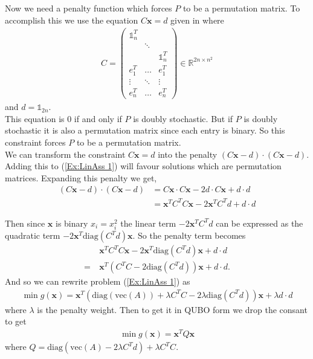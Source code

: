 \documentclass{article}
\begin{document}
\noindent Now we need a penalty function which forces \(P\) to be a permutation matrix. To accomplish this we use the equation \(C\mathbf{x} = d\) given in \cite[p.~8]{klus2023continuous} where 
\begin{align}\label{mat:CD}
    C = \begin{pmatrix}
        \mathbb{1}_n^T & & \\
         & \ddots & \\ 
         & & \mathbb{1}_n^T \\
         e_1^T & \hdots & e_1^T \\
         \vdots & \ddots & \vdots \\
         e_n^T & \hdots & e_n^T
    \end{pmatrix} \in \mathbb{R}^{2n \times n^2}
\end{align}
and \(d = \mathbb{1}_{2n}\). \\

\noindent This equation is 0 if and only if \(P\) is doubly stochastic. But if \(P\) is doubly stochastic it is also a permutation matrix since each entry is binary. So this constraint forces \(P\) to be a permutation matrix.\\

\noindent We can transform the constraint \(C\mathbf{x} = d\) into the penalty \((C\mathbf{x} - d) \cdot (C\mathbf{x} - d)\). Adding this to (\ref{Ex:LinAss 1}) will favour solutions which are  permutation matrices.
Expanding this penalty we get,
\begin{align*}
    (C\mathbf{x} - d) \cdot (C\mathbf{x} - d) &= C\mathbf{x} \cdot C\mathbf{x} - 2d\cdot C\mathbf{x} + d \cdot d \\
    &= \mathbf{x}^T C^T C \mathbf{x} -2\mathbf{x}^T C^T d + d\cdot d
\end{align*}

\noindent Then since \(\mathbf{x}\) is binary \(x_i = x_i^2\) the linear term \(-2\mathbf{x}^T C^T d\) can be expressed as the quadratic term \(-2\mathbf{x}^T\text{diag}(C^Td)\mathbf{x}\). So the penalty term becomes
\begin{align}
    &\mathbf{x}^T C^T C \mathbf{x} -2\mathbf{x}^T\text{diag}(C^Td)\mathbf{x} + d\cdot d \nonumber \\
    = \: &\mathbf{x}^T(C^T C -2\text{diag}(C^Td))\mathbf{x} + d\cdot d. \label{penalty:CX}
\end{align}
And so we can rewrite problem (\ref{Ex:LinAss 1}) as 
\begin{align*}
    \min g(\mathbf{x}) = \mathbf{x}^T (\text{diag}(\text{vec}(A)) + \lambda C^T C - 2\lambda\text{diag}(C^T d))\mathbf{x} + \lambda d\cdot d
\end{align*}
where \(\lambda\) is the penalty weight. Then to get it in QUBO form we drop the consant to get
\begin{align*}
    \min g(\mathbf{x}) = \mathbf{x}^T Q \mathbf{x}
\end{align*}
where \(Q = \text{diag}(\text{vec}(A) - 2\lambda C^Td) + \lambda C^T C\).\\
\end{document}
